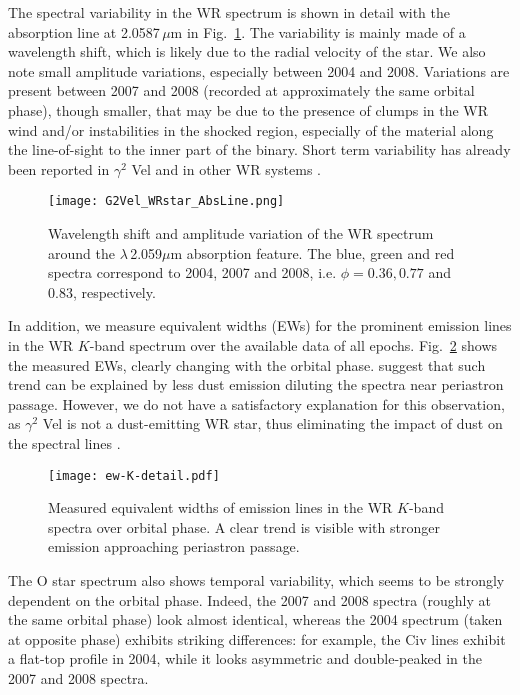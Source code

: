 \documentclass[usenatbib]{mnras}%
\begin{document}
The spectral variability in the WR spectrum is shown in detail with the  absorption line at 2.0587\,$\mu$m in Fig.~\ref{Fig:zoomspectraGammaVel}. The variability is mainly made of a wavelength shift, which is likely due to the radial velocity of the star. We also note small amplitude variations, especially between 2004 and 2008. Variations are present between 2007 and 2008 (recorded at approximately the same orbital phase), though smaller, that may be due to the presence of clumps in the WR wind and/or instabilities in the shocked region, especially of the material along the line-of-sight to the inner part of the binary. Short term variability has already been reported in $\gamma^2$ Vel \citep{1990A&A...240..105B} and in other WR systems \citep[see e.g.][]{1997PASP..109..504L,1999MNRAS.302..549S}.
\begin{figure}
\centering
    \texttt{[image: G2Vel\_WRstar\_AbsLine.png]}
  \caption{
    Wavelength shift and amplitude variation of the WR spectrum around the  $\lambda$\,2.059$\mu$m absorption feature. The blue, green and red spectra correspond to 2004, 2007 and 2008, i.e. $\phi=0.36, 0.77$ and $0.83$, respectively.
    \label{Fig:zoomspectraGammaVel}
  }
\end{figure}


In addition, we measure equivalent widths (EWs) for the prominent emission lines in the WR $K$-band spectrum over the available data of all epochs. Fig.~\ref{Fig:EW-orbitalphase} shows the measured EWs, clearly changing with the orbital phase. \citet{Varricatt+2004} suggest that such trend can be explained by less dust emission diluting the spectra near periastron passage. However, we do not have a satisfactory explanation for this observation, as $\gamma^2$ Vel is not a dust-emitting WR star, thus eliminating the impact of dust on the spectral lines \citep{2002ASPC..260..331M}. 


\begin{figure}
\centering
    \texttt{[image: ew-K-detail.pdf]}
  \caption{
  Measured equivalent widths of emission lines in the WR $K$-band spectra over orbital phase. A clear trend is visible with stronger emission approaching periastron passage.}
    \label{Fig:EW-orbitalphase}
\end{figure}

The O star spectrum also shows temporal variability, which seems to be strongly dependent on the orbital phase. Indeed, the 2007 and 2008 spectra (roughly at the same orbital phase) look almost identical, whereas the 2004 spectrum (taken at opposite phase) exhibits striking differences: for example, the C{\sc iv} lines exhibit a flat-top profile in 2004, while it looks asymmetric and double-peaked in the 2007 and 2008 spectra.
\end{document}
